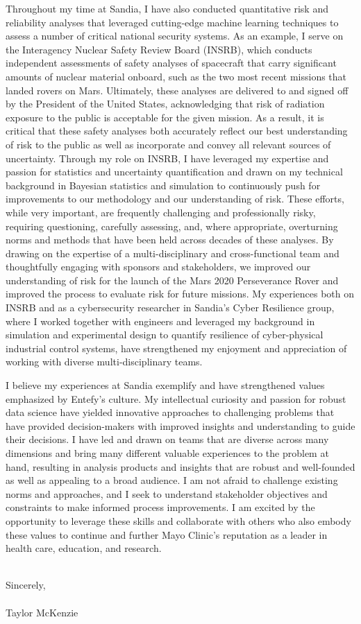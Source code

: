 \documentclass[10pt]{article}
\begin{document}
Throughout my time at Sandia, I have also conducted quantitative risk and reliability analyses that leveraged cutting-edge machine learning techniques to assess a number of critical national security systems. As an example, I serve on the Interagency Nuclear Safety Review Board (INSRB), which conducts independent assessments of safety analyses of spacecraft that carry significant amounts of nuclear material onboard, such as the two most recent missions that landed rovers on Mars. Ultimately, these analyses are delivered to and signed off by the President of the United States, acknowledging that risk of radiation exposure to the public is acceptable for the given mission. As a result, it is critical that these safety analyses both accurately reflect our best understanding of risk to the public as well as incorporate and convey all relevant sources of uncertainty. Through my role on INSRB, I have leveraged my expertise and passion for statistics and uncertainty quantification and drawn on my technical background in Bayesian statistics and simulation to continuously push for improvements to our methodology and our understanding of risk. These efforts, while very important, are frequently challenging and professionally risky, requiring questioning, carefully assessing, and, where appropriate, overturning norms and methods that have been held across decades of these analyses. By drawing on the expertise of a multi-disciplinary and cross-functional team and thoughtfully engaging with sponsors and stakeholders, we improved our understanding of risk for the launch of the Mars 2020 Perseverance Rover and improved the process to evaluate risk for future missions. My experiences both on INSRB and as a cybersecurity researcher in Sandia's Cyber Resilience group, where I worked together with engineers and leveraged my background in simulation and experimental design to quantify resilience of cyber-physical industrial control systems, have strengthened my enjoyment and appreciation of working with diverse multi-disciplinary teams.

I believe my experiences at Sandia exemplify and have strengthened values emphasized by Entefy's culture. My intellectual curiosity and passion for robust data science have yielded innovative approaches to challenging problems that have provided decision-makers with improved insights and understanding to guide their decisions. I have led and drawn on teams that are diverse across many dimensions and bring many different valuable experiences to the problem at hand, resulting in analysis products and insights that are robust and well-founded as well as appealing to a broad audience. I am not afraid to challenge existing norms and approaches, and I seek to understand stakeholder objectives and constraints to make informed process improvements. I am excited by the opportunity to leverage these skills and collaborate with others who also embody these values to continue and further Mayo Clinic's reputation as a leader in health care, education, and research.

\noindent \\Sincerely,\\\\
Taylor McKenzie
\end{document}
